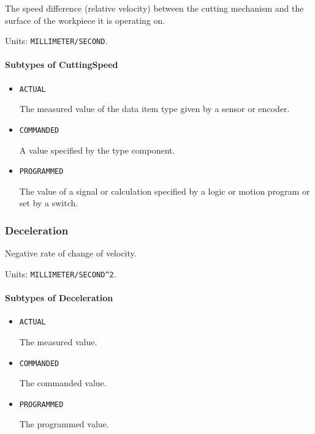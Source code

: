 The speed difference (relative velocity) between the cutting mechanism and the surface of the workpiece it is operating on.


Units: \texttt{MILLIMETER/SECOND}.

\paragraph{Subtypes of CuttingSpeed}\mbox{}
\label{sec:Subtypes of CuttingSpeed}

\begin{itemize}

\item \texttt{ACTUAL}


The measured value of the data item type given by a sensor or encoder.

\item \texttt{COMMANDED}


A value specified by the  type component.

\item \texttt{PROGRAMMED}


The value of a signal or calculation specified by a logic or motion program or set by a switch.


\end{itemize}

\subsubsection{Deceleration}
\label{sec:Deceleration}



Negative rate of change of velocity.


Units: \texttt{MILLIMETER/SECOND\^{}2}.

\paragraph{Subtypes of Deceleration}\mbox{}
\label{sec:Subtypes of Deceleration}

\begin{itemize}

\item \texttt{ACTUAL}


The measured value.

\item \texttt{COMMANDED}


The commanded value.

\item \texttt{PROGRAMMED}


The programmed value.


\end{itemize}

